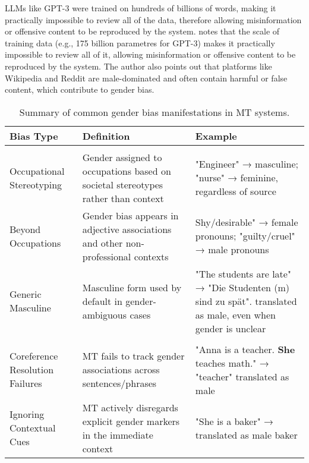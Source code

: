 LLMs like GPT-3 were trained on hundreds of billions of words, making it practically impossible to review all of the data, therefore allowing misinformation or offensive content to be reproduced by the system.
\citet{ullmannGenderBiasMachine2022} notes that the scale of training data (e.g., 175 billion parametres for GPT-3) makes it practically impossible to review all of it, allowing misinformation or offensive content to be reproduced by the system. The author also points out that platforms like Wikipedia and Reddit are male-dominated and often contain harmful or false content, which contribute to gender bias.




\begin{table}[ht]
\centering
\begin{tabularx}{\textwidth}{>{\raggedright\arraybackslash}p{3cm} >{\raggedright\arraybackslash}X >{\raggedright\arraybackslash}X}
\toprule
\textbf{Bias Type} & \textbf{Definition} & \textbf{Example} \\
\midrule
\multicolumn{3}{l}{\textbf{Stereotype-Driven Biases}} \\
\midrule
Occupational Stereotyping & Gender assigned to occupations based on societal stereotypes rather than context & "Engineer" → masculine; "nurse" → feminine, regardless of source \\
\addlinespace
Beyond Occupations & Gender bias appears in adjective associations and other non-professional contexts & Shy/desirable" → female pronouns; "guilty/cruel" → male pronouns \\
\addlinespace
Generic Masculine & Masculine form used by default in gender-ambiguous cases & "The students are late" → "Die Studenten (m) sind zu spät". translated as male, even when gender is unclear \\
\midrule
\multicolumn{3}{l}{\textbf{Contextual Failures}} \\
\midrule
Coreference Resolution Failures & MT fails to track gender associations across sentences/phrases & "Anna is a teacher. \textbf{She} teaches math." → "teacher" translated as male \\
\addlinespace
Ignoring Contextual Cues & MT actively disregards explicit gender markers in the immediate context & "She is a baker" → translated as male baker \\
\bottomrule
\end{tabularx}
\caption{Summary of common gender bias manifestations in MT systems.}
\label{tab:gender_biases}
\end{table}


